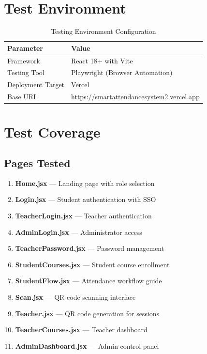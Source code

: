 \documentclass[11pt, a4paper]{report}
\begin{document}
\section{Test Environment}

\begin{table}[H]
    \centering
    \caption{Testing Environment Configuration}
    \begin{tabular}{|l|l|}
        \hline
        \textbf{Parameter} & \textbf{Value} \\
        \hline
        Framework & React 18+ with Vite \\
        Testing Tool & Playwright (Browser Automation) \\
        Deployment Target & Vercel \\
        Base URL & https://smartattendancesystem2.vercel.app \\
        \hline
    \end{tabular}
\end{table}

\section{Test Coverage}

\subsection{Pages Tested}

\begin{enumerate}
    \item \textbf{Home.jsx} --- Landing page with role selection
    \item \textbf{Login.jsx} --- Student authentication with SSO
    \item \textbf{TeacherLogin.jsx} --- Teacher authentication
    \item \textbf{AdminLogin.jsx} --- Administrator access
    \item \textbf{TeacherPassword.jsx} --- Password management
    \item \textbf{StudentCourses.jsx} --- Student course enrollment
    \item \textbf{StudentFlow.jsx} --- Attendance workflow guide
    \item \textbf{Scan.jsx} --- QR code scanning interface
    \item \textbf{Teacher.jsx} --- QR code generation for sessions
    \item \textbf{TeacherCourses.jsx} --- Teacher dashboard
    \item \textbf{AdminDashboard.jsx} --- Admin control panel
\end{enumerate}
\end{document}
